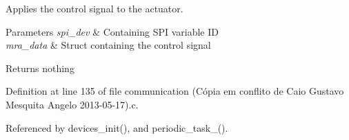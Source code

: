 Applies the control signal to the actuator. 


\begin{DoxyParams}{Parameters}
{\em spi\-\_\-dev} & Containing S\-P\-I variable I\-D \\
\hline
{\em mra\-\_\-data} & Struct containing the control signal \\
\hline
\end{DoxyParams}
\begin{DoxyReturn}{Returns}
nothing 
\end{DoxyReturn}


Definition at line 135 of file communication (\-Cópia em conflito de Caio Gustavo Mesquita Angelo 2013-\/05-\/17).\-c.



Referenced by devices\-\_\-init(), and periodic\-\_\-task\-\_().


